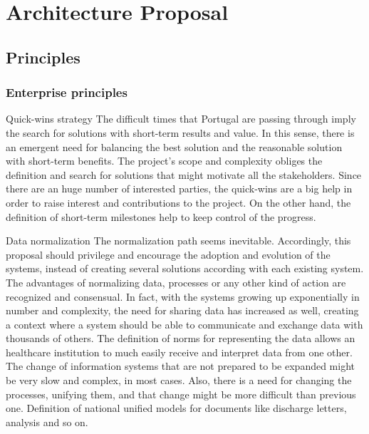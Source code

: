 \chapter{Architecture Proposal} \label{chap:arch-proposal}

\section*{}

\section{Principles}

\subsection{Enterprise principles}

{Quick-wins strategy}
{The difficult times that Portugal are passing through imply the search for solutions with short-term results and value. In this sense, there is an emergent need for balancing the best solution and the reasonable solution with short-term benefits.}
{The project's scope and complexity obliges the definition and search for solutions that might motivate all the stakeholders. Since there are an huge number of interested parties, the quick-wins are a big help in order to raise interest and contributions to the project. On the other hand, the definition of short-term milestones help to keep control of the progress.}
{}


{Data normalization}
{The normalization path seems inevitable. Accordingly, this proposal should privilege and encourage the adoption and evolution of the systems, instead of creating several solutions according with each existing system.}
{The advantages of normalizing data, processes or any other kind of action are recognized and consensual. In fact, with the systems growing up exponentially in number and complexity, the need for sharing data has increased as well, creating a context where a system should be able to communicate and exchange data with thousands of others. The definition of norms for representing the data allows an healthcare institution to much easily receive and interpret data from one other.}
{The change of information systems that are not prepared to be expanded might be very slow and complex, in most cases. Also, there is a need for changing the processes, unifying them, and that change might be more difficult than previous one.}
{Definition of national unified models for documents like discharge letters, analysis and so on.} 



